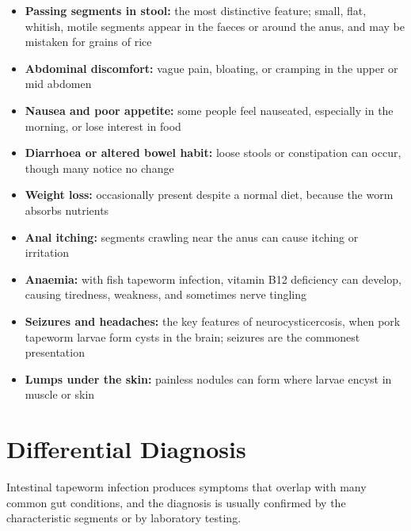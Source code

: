 \begin{itemize}
    \item \textbf{Passing segments in stool:} the most distinctive feature; small, flat, whitish, motile segments appear in the faeces or around the anus, and may be mistaken for grains of rice
    \item \textbf{Abdominal discomfort:} vague pain, bloating, or cramping in the upper or mid abdomen
    \item \textbf{Nausea and poor appetite:} some people feel nauseated, especially in the morning, or lose interest in food
    \item \textbf{Diarrhoea or altered bowel habit:} loose stools or constipation can occur, though many notice no change
    \item \textbf{Weight loss:} occasionally present despite a normal diet, because the worm absorbs nutrients
    \item \textbf{Anal itching:} segments crawling near the anus can cause itching or irritation
    \item \textbf{Anaemia:} with fish tapeworm infection, vitamin B12 deficiency can develop, causing tiredness, weakness, and sometimes nerve tingling
    \item \textbf{Seizures and headaches:} the key features of neurocysticercosis, when pork tapeworm larvae form cysts in the brain; seizures are the commonest presentation
    \item \textbf{Lumps under the skin:} painless nodules can form where larvae encyst in muscle or skin
\end{itemize}

\section*{Differential Diagnosis}
Intestinal tapeworm infection produces symptoms that overlap with many common gut conditions, and the diagnosis is usually confirmed by the characteristic segments or by laboratory testing.

